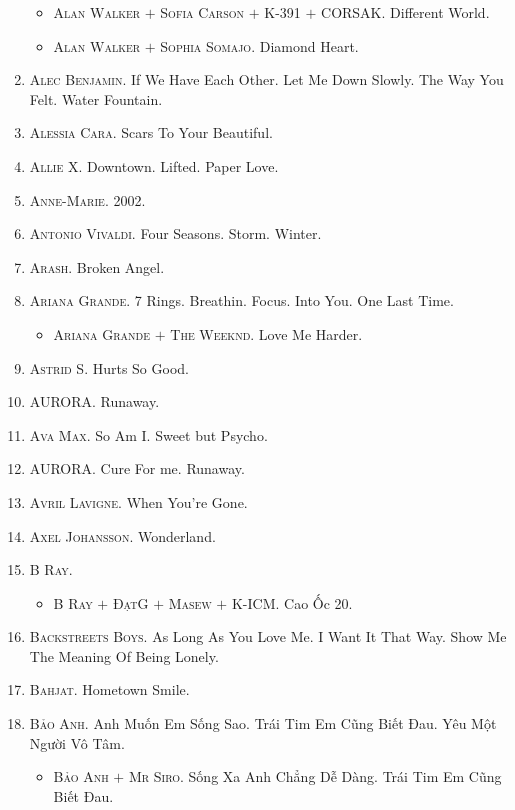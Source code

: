 \documentclass[oneside]{book}
\numberwithin{equation}{section}
\begin{document}
\begin{enumerate}
\begin{itemize}
		\item \textsc{Alan Walker $+$ Sofia Carson $+$ K-391 $+$ CORSAK.} Different World.
		\item \textsc{Alan Walker $+$ Sophia Somajo.} Diamond Heart.
	\end{itemize}
	\item \textsc{Alec Benjamin.} If We Have Each Other. Let Me Down Slowly. The Way You Felt. Water Fountain.
	\item \textsc{Alessia Cara.} Scars To Your Beautiful.
	\item \textsc{Allie X.} Downtown. Lifted. Paper Love.
	\item \textsc{Anne-Marie.} 2002.
	\item \textsc{Antonio Vivaldi.} Four Seasons. Storm. Winter.
	\item \textsc{Arash.} Broken Angel.
	\item \textsc{Ariana Grande.} 7 Rings. Breathin. Focus. Into You. One Last Time.
	\begin{itemize}
		\item \textsc{Ariana Grande $+$ The Weeknd.} Love Me Harder.
	\end{itemize}
	\item \textsc{Astrid S.} Hurts So Good.
	\item \textsc{AURORA.} Runaway.
	\item \textsc{Ava Max.} So Am I. Sweet but Psycho.
	\item \textsc{AURORA.} Cure For me. Runaway.
	\item \textsc{Avril Lavigne.} When You're Gone.
	\item \textsc{Axel Johansson.} Wonderland.
	\item \textsc{B Ray.}
	\begin{itemize}
		\item \textsc{B Ray $+$ ĐạtG $+$ Masew $+$ K-ICM.} Cao Ốc 20.
	\end{itemize}
	\item \textsc{Backstreets Boys.} As Long As You Love Me. I Want It That Way. Show Me The Meaning Of Being Lonely.
	\item \textsc{Bahjat.} Hometown Smile.
	\item \textsc{Bảo Anh.} Anh Muốn Em Sống Sao. Trái Tim Em Cũng Biết Đau. Yêu Một Người Vô Tâm.
	\begin{itemize}
		\item \textsc{Bảo Anh $+$ Mr Siro.} Sống Xa Anh Chẳng Dễ Dàng. Trái Tim Em Cũng Biết Đau.
	\end{itemize}

\end{enumerate}
\end{document}
